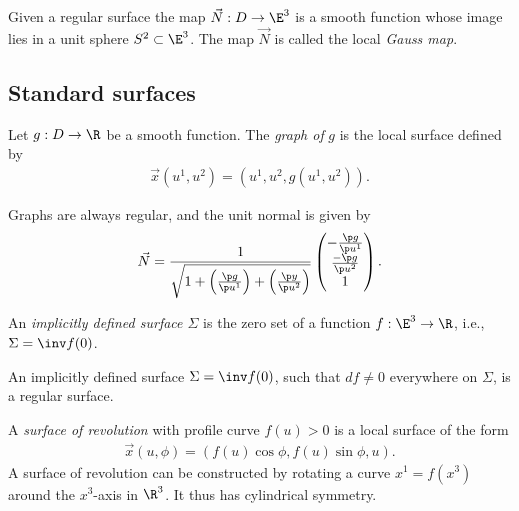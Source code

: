 \documentclass{article}
\begin{document}
\begin{proposition}[Notes 6.7]
    Given a regular surface the map $\vec N:D\to\E^3$ is a smooth function whose
    image lies in a unit sphere $S^2\subset\E^3$. The map $\vec N$ is called the
    local \emph{Gauss map}.
\end{proposition}

\subsection{Standard surfaces}

\begin{definition}
    Let $g:D\to\R$ be a smooth function. The \emph{graph of} $g$ is the local surface 
    defined by 
    \begin{align*}
        \vec x(u^1, u^2) = (u^1, u^2, g(u^1, u^2)).
    \end{align*}
\end{definition}

\begin{proposition}[Notes 6.11]
    Graphs are always regular, and the unit normal is given by
    \begin{align*}
        \vec N = \frac{1}{\sqrt{1 + \left(\frac{\p g}{\p u^1}\right) + \left(\frac{\p y}{\p u^2}\right)}}\begin{pmatrix}
            -\frac{\p g}{\p u^1} \\ \frac{-\p g}{\p u^2} \\ 1
        \end{pmatrix}.
    \end{align*}
\end{proposition}

\begin{definition}
    An \emph{implicitly defined surface $\Sigma$} is the zero set of a function
    $f:\E^3\to\R$, i.e., $\Sigma=\inv f(0)$.
\end{definition}

\begin{proposition}[Notes 6.13]
    An implicitly defined surface $\Sigma = \inv f(0)$, such that $df\not=0$
    everywhere on $\Sigma$, is a regular surface.
\end{proposition}

\begin{definition}
    A \emph{surface of revolution} with profile curve $f(u)>0$ is a local 
    surface of the form 
    \begin{align*}
        \vec x(u, \phi) = (f(u)\cos\phi,f(u)\sin\phi,u).
    \end{align*}
    A surface of revolution can be constructed by rotating a curve $x^1=f(x^3)$
    around the $x^3$-axis in $\R^3$. It thus has cylindrical symmetry.
\end{definition}
\end{document}
